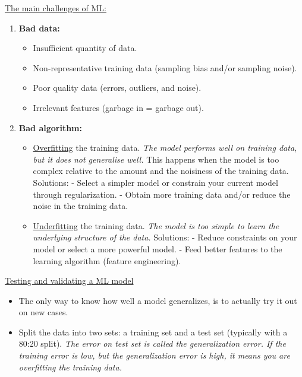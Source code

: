 \newpage
\underline{The main challenges of ML:}
\begin{enumerate}
\vspace{-4.0mm}
\item
\textbf{Bad data:}
\begin{itemize}
\vspace{-2.0mm}
\item
Insufficient quantity of data.
\item
Non-representative training data (sampling bias and/or sampling noise).
\item
Poor quality data (errors, outliers, and noise).
\item
Irrelevant features (garbage in = garbage out).
\end{itemize}
\item
\textbf{Bad algorithm:}
\begin{itemize}
\vspace{-2.0mm}
\item
\underline{Overfitting} the training data.\newline
\textit{The model performs well on training data, but it does not generalise well.}\newline
This happens when the model is too complex relative to the amount and the noisiness of the training data.
Solutions:\newline
- Select a simpler model or constrain your current model through regularization.\newline
- Obtain more training data and/or reduce the noise in the training data.
\item
\underline{Underfitting} the training data.\newline
\textit{The model is too simple to learn the underlying structure of the data.}
Solutions:\newline
- Reduce constraints on your model or select a more powerful model.\newline
- Feed better features to the learning algorithm (feature engineering).
\end{itemize}
\end{enumerate}

\vspace{+3.0mm}
\underline{Testing and validating a ML model}
\begin{itemize}
\vspace{-3.0mm}
\item
The only way to know how well a model generalizes, is to actually try it out on new cases.
\item
Split the data into two sets: a training set and a test set (typically with a 80:20 split).\newline
\textit{The error on test set is called the generalization error.
If the training error is low, but the generalization error is high, it means you are overfitting the training data.}
\end{itemize}

